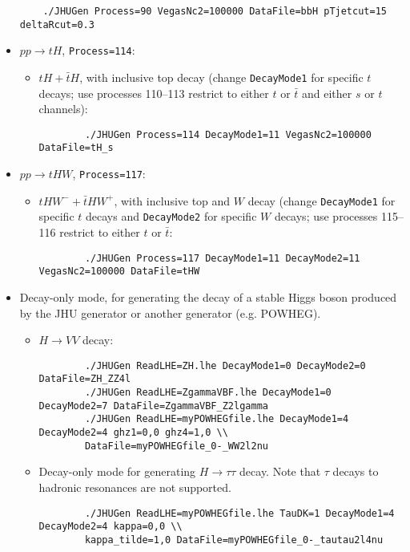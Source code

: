 \documentclass[aps,superscriptaddress,nofootinbib]{revtex4}
\begin{document}
\begin{itemize}
\begin{verbatim}
	./JHUGen Process=90 VegasNc2=100000 DataFile=bbH pTjetcut=15 deltaRcut=0.3
	\end{verbatim}
	\item $pp \to tH$, \texttt{Process=114}:
	\begin{itemize}
		\item $tH+\bar{t}H$, with inclusive top decay (change \verb|DecayMode1| for specific $t$ decays; use processes 110--113 restrict to either $t$ or $\bar{t}$ and either $s$ or $t$ channels):
		\begin{verbatim}
		./JHUGen Process=114 DecayMode1=11 VegasNc2=100000 DataFile=tH_s
		\end{verbatim}
	\end{itemize}
	\item $pp \to tHW$, \texttt{Process=117}:
	\begin{itemize}
		\item $tHW^-+\bar{t}HW^+$, with inclusive top and $W$ decay (change \verb|DecayMode1| for specific $t$ decays and \verb|DecayMode2| for specific $W$ decays; use processes 115--116 restrict to either $t$ or $\bar{t}$:
		\begin{verbatim}
		./JHUGen Process=117 DecayMode1=11 DecayMode2=11 VegasNc2=100000 DataFile=tHW
		\end{verbatim}
	\end{itemize}
	\item Decay-only mode, for generating the decay of a stable Higgs boson produced by the JHU generator or another generator (e.g. POWHEG).
	\begin{itemize}
		\item $H\to VV$ decay:
		\begin{verbatim}
		./JHUGen ReadLHE=ZH.lhe DecayMode1=0 DecayMode2=0 DataFile=ZH_ZZ4l
		./JHUGen ReadLHE=ZgammaVBF.lhe DecayMode1=0 DecayMode2=7 DataFile=ZgammaVBF_Z2lgamma
		./JHUGen ReadLHE=myPOWHEGfile.lhe DecayMode1=4 DecayMode2=4 ghz1=0,0 ghz4=1,0 \\
	    DataFile=myPOWHEGfile_0-_WW2l2nu
		\end{verbatim}
		\item Decay-only mode for generating $H\to\tau\tau$ decay.  Note that $\tau$ decays to hadronic resonances are not supported.
		\begin{verbatim}
		./JHUGen ReadLHE=myPOWHEGfile.lhe TauDK=1 DecayMode1=4 DecayMode2=4 kappa=0,0 \\
		kappa_tilde=1,0 DataFile=myPOWHEGfile_0-_tautau2l4nu
		\end{verbatim}
	\end{itemize}
\end{itemize}
\end{document}
